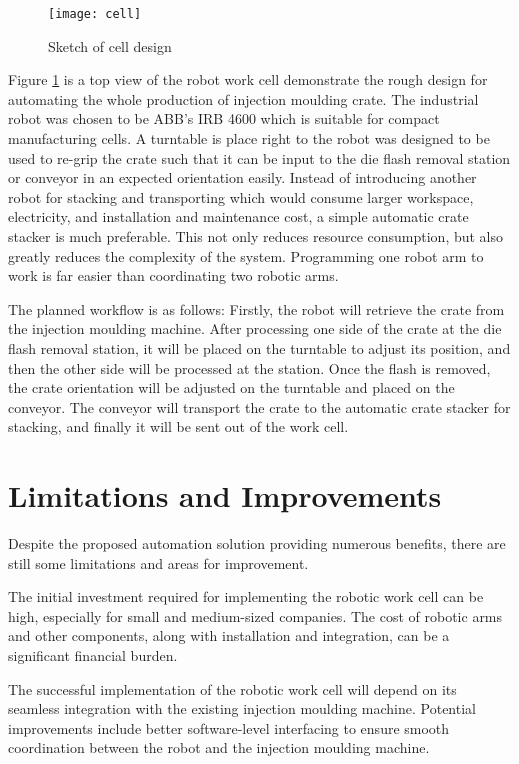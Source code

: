 \begin{figure}[htbp]
   \centering
   \texttt{[image: cell]}
   \caption{Sketch of cell design}
   \label{fig:cell}
\end{figure}

Figure \ref{fig:cell} is a top view of the robot work cell demonstrate the rough design for automating the whole production of injection moulding crate. The industrial robot was chosen to be ABB's IRB 4600 which is suitable for compact manufacturing cells. A turntable is place right to the robot was designed to be used to re-grip the crate such that it can be input to the die flash removal station or conveyor in an expected orientation easily. Instead of introducing another robot for stacking and transporting which would consume larger workspace, electricity, and installation and maintenance cost, a simple automatic crate stacker is much preferable. This not only reduces resource consumption, but also greatly reduces the complexity of the system. Programming one robot arm to work is far easier than coordinating two robotic arms.

The planned workflow is as follows: Firstly, the robot will retrieve the crate from the injection moulding machine. After processing one side of the crate at the die flash removal station, it will be placed on the turntable to adjust its position, and then the other side will be processed at the station. Once the flash is removed, the crate orientation will be adjusted on the turntable and placed on the conveyor. The conveyor will transport the crate to the automatic crate stacker for stacking, and finally it will be sent out of the work cell.

\section{Limitations and Improvements}

Despite the proposed automation solution providing numerous benefits, there are still some limitations and areas for improvement.

The initial investment required for implementing the robotic work cell can be high, especially for small and medium-sized companies. The cost of robotic arms and other components, along with installation and integration, can be a significant financial burden.

The successful implementation of the robotic work cell will depend on its seamless integration with the existing injection moulding machine. Potential improvements include better software-level interfacing to ensure smooth coordination between the robot and the injection moulding machine.

